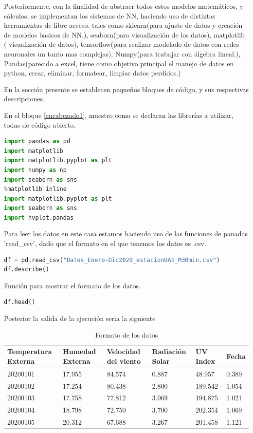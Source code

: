 Posteriormente, con la finalidad de abstraer todos estos modelos matemáticos, y
cálculos, se implementan los sistemas de NN, haciendo uso de distintas
herramientas de libre acceso. tales como sklearn(para ajuste de datos y
creación de modelos basicos de NN.),
seaborn(para visualización de los datos), matplotlib ( visualización de datos),
tensorflow(para realizar modelado de datos con redes neuronales un tanto mas
complejas), Numpy(para trabajar con álgebra lineal.), Pandas(parecido a excel,
tiene como objetivo principal el manejo de datos en python, crear, eliminar,
formatear, limpiar datos perdidos.)

En la sección presente se establecen pequeños bloques de código, y sus respectivas
descripciones.

En el bloque \ref{encabezado1}, muestro como se declaran las librerías a
utilizar, todas de código abierto. 

\begin{lstlisting}[language=Python, caption=Librerías empleados durante el
proceso, label={encabezado1}]
import pandas as pd 
import matplotlib 
import matplotlib.pyplot as plt
import numpy as np
import seaborn as sns
%matplotlib inline
import matplotlib.pyplot as plt
import seaborn as sns
import hvplot.pandas
\end{lstlisting}
Para leer los datos en este casa estamos haciendo uso de las funciones de
panadas 'read\_csv',  dado que el formato en el que tenemos los datos es .csv. 
\begin{lstlisting}[language=Python, caption=Carga de los datos]
df = pd.read_csv("Datos_Enero-Dic2020_estacionUAS_M30min.csv")
df.describe()
\end{lstlisting}
Función para mostrar el formato de los datos.
\begin{lstlisting}[language=Python, caption=Muestra de los datos]
df.head()
\end{lstlisting}
Posterior la salida de la ejecución seria la siguiente
\begin{table}[H]
    \centering
    \begin{tabular}{p{2cm}p{2cm}p{2cm}p{2cm}p{2cm}p{2cm}}\hline
        Temperatura Externa &	Humedad Externa &	Velocidad del viento&
        Radiación Solar&	UV Index & Fecha\\\hline
        20200101 &	17.955& 84.574&	0.887&	48.957&	    0.389\\
        20200102&	17.254&	80.438&	2.800&	189.542&	1.054\\
        20200103&	17.758&	77.812&	3.069&	194.875&	1.021\\
        20200104&	18.798&	72.750&	3.700&	202.354&	1.069\\
        20200105&	20.312&	67.688&	3.267&	201.458&	1.121\\
        \hline
    \end{tabular}
    \caption{Formato de los datos}
    \label{formato de la data}
\end{table}

